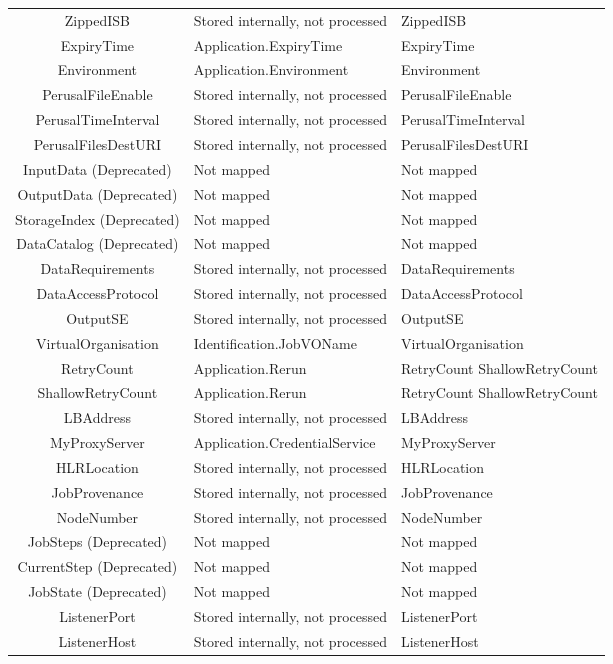 \documentclass{article}
\newcommand{\NM}{\normalsize{\textnormal{Not mapped}}}
\newcommand{\NST}[1]{\normalsize{\textnormal{#1}}}
\begin{document}
\begin{center}
\begin{tabularx}{\textwidth}{CTT}
ZippedISB & Stored internally, not processed & ZippedISB\\
ExpiryTime & Application.ExpiryTime & ExpiryTime\\
Environment & Application.Environment & Environment\\
PerusalFileEnable & \NST{Stored internally, not processed} & PerusalFileEnable\\
PerusalTimeInterval & \NST{Stored internally, not processed} & PerusalTimeInterval\\
PerusalFilesDestURI & \NST{Stored internally, not processed} & PerusalFilesDestURI\\
InputData \NST{(Deprecated)} & \NM & \NM\\
OutputData \NST{(Deprecated)} & \NM & \NM\\
StorageIndex \NST{(Deprecated)} & \NM & \NM\\
DataCatalog \NST{(Deprecated)} & \NM & \NM\\
DataRequirements & \NST{Stored internally, not processed} & DataRequirements\\
DataAccessProtocol & \NST{Stored internally, not processed} & DataAccessProtocol\\
OutputSE & \NST{Stored internally, not processed} & OutputSE\\
VirtualOrganisation & Identification.JobVOName & VirtualOrganisation\\
RetryCount & Application.Rerun & RetryCount ShallowRetryCount\\
ShallowRetryCount & Application.Rerun & RetryCount ShallowRetryCount\\
LBAddress & \NST{Stored internally, not processed} & LBAddress\\
MyProxyServer & Application.CredentialService & MyProxyServer\\
HLRLocation & \NST{Stored internally, not processed} & HLRLocation\\
JobProvenance & \NST{Stored internally, not processed} & JobProvenance\\
NodeNumber & \NST{Stored internally, not processed} & NodeNumber\\
JobSteps \NST{(Deprecated)} & \NM & \NM\\
CurrentStep \NST{(Deprecated)} & \NM & \NM\\
JobState \NST{(Deprecated)} & \NM & \NM\\
ListenerPort & \NST{Stored internally, not processed} & ListenerPort\\
ListenerHost & \NST{Stored internally, not processed} & ListenerHost\\

\end{tabularx}
\end{center}
\end{document}
